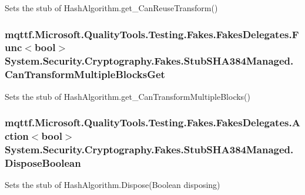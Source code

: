 Sets the stub of Hash\-Algorithm.\-get\-\_\-\-Can\-Reuse\-Transform()

\hypertarget{class_system_1_1_security_1_1_cryptography_1_1_fakes_1_1_stub_s_h_a384_managed_ae20bd75a32dbad311fd540c71f2b4c44}{
\subsubsection[{Can\-Transform\-Multiple\-Blocks\-Get}]{\setlength{\rightskip}{0pt plus 5cm}mqttf.\-Microsoft.\-Quality\-Tools.\-Testing.\-Fakes.\-Fakes\-Delegates.\-Func$<$bool$>$ System.\-Security.\-Cryptography.\-Fakes.\-Stub\-S\-H\-A384\-Managed.\-Can\-Transform\-Multiple\-Blocks\-Get}}\label{class_system_1_1_security_1_1_cryptography_1_1_fakes_1_1_stub_s_h_a384_managed_ae20bd75a32dbad311fd540c71f2b4c44}


Sets the stub of Hash\-Algorithm.\-get\-\_\-\-Can\-Transform\-Multiple\-Blocks()

\hypertarget{class_system_1_1_security_1_1_cryptography_1_1_fakes_1_1_stub_s_h_a384_managed_aa16713bf4b52958334f609c11f92a866}{
\subsubsection[{Dispose\-Boolean}]{\setlength{\rightskip}{0pt plus 5cm}mqttf.\-Microsoft.\-Quality\-Tools.\-Testing.\-Fakes.\-Fakes\-Delegates.\-Action$<$bool$>$ System.\-Security.\-Cryptography.\-Fakes.\-Stub\-S\-H\-A384\-Managed.\-Dispose\-Boolean}}\label{class_system_1_1_security_1_1_cryptography_1_1_fakes_1_1_stub_s_h_a384_managed_aa16713bf4b52958334f609c11f92a866}


Sets the stub of Hash\-Algorithm.\-Dispose(\-Boolean disposing)

